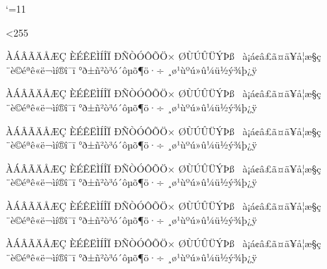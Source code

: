
%
%
%
%


\catcode`\@=11

\def\deactivatehigh{\count@=128 \loop \catcode{}
 \ifnum\count@<255 \advance{} \repeat}

\deactivatehigh %

\def\doutfA{%
 \do^^80^^c0\do^^81^^c1\do^^82^^c2\do^^83^^c3\do^^84^^c4\do^^85^^c5\do^^86^^c6\do^^87^^c7%
 \do^^88^^c8\do^^89^^c9\do^^8a^^ca\do^^8b^^cb\do^^8c^^cc\do^^8d^^cd\do^^8e^^ce\do^^8f^^cf%
 \do^^90^^d0\do^^91^^d1\do^^92^^d2\do^^93^^d3\do^^94^^d4\do^^95^^d5\do^^96^^d6\do^^97^^d7%
 \do^^98^^d8\do^^99^^d9\do^^9a^^da\do^^9b^^db\do^^9c^^dc\do^^9d^^dd\do^^9e^^de\do^^9f^^df%
 \do^^a0^^e0\do^^a1^^e1\do^^a2^^e2\do^^a3^^e3\do^^a4^^e4\do^^a5^^e5\do^^a6^^e6\do^^a7^^e7%
 \do^^a8^^e8\do^^a9^^e9\do^^aa^^ea\do^^ab^^eb\do^^ac^^ec\do^^ad^^ed\do^^ae^^ee\do^^af^^ef%
 \do^^b0^^f0\do^^b1^^f1\do^^b2^^f2\do^^b3^^f3\do^^b4^^f4\do^^b5^^f5\do^^b6^^f6\do^^b7^^f7%
 \do^^b8^^f8\do^^b9^^f9\do^^ba^^fa\do^^bb^^fb\do^^bc^^fc\do^^bd^^fd\do^^be^^fe\do^^bf^^ff%
}

\def\do#1#2{\expandafter\def
 \csname\string^^c2\string#1@utf\endcsname{\string^^c2\string#1}}\doutfA
\def\do#1#2{\expandafter\def
 \csname\string^^c3\string#1@utf\endcsname{\string^^c3\string#1}}\doutfA
\def\do#1#2{\expandafter\def
 \csname\string^^c2\string#1@pdf\endcsname{\string#1}}\doutfA
\def\do#1#2{\expandafter\def
 \csname\string^^c3\string#1@pdf\endcsname{\string#2}}\doutfA
\def\do#1#2{\expandafter\def
 \csname\string^^c2\string#1@iso\endcsname{\string#1}}\doutfA
\def\do#1#2{\expandafter\def
 \csname\string^^c3\string#1@iso\endcsname{\string#2}}\doutfA

